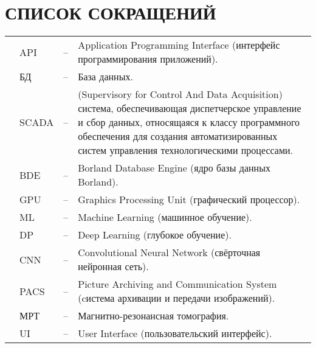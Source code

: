 \sectionbreak \section*{ 
    \gostTitleFont
    \redline
    СПИСОК СОКРАЩЕНИЙ
}
\titlespace

{\gostFont

\begin{tabular}{p{0.85cm} p{1.75cm} p{0.3cm} p{131.5mm}}
    & API & {--} & Application Programming Interface (интерфейс программирования приложений). \\
    & БД & {--} & База данных. \\
    & SCADA & {--} & (Supervisory for Control And Data Acquisition) система, обеспечивающая диспетчерское управление и сбор данных, относящаяся к классу программного обеспечения для создания автоматизированных систем управления технологическими процессами. \\
    & BDE & {--} & Borland Database Engine (ядро базы данных Borland). \\
    & GPU & {--} & Graphics Processing Unit (графический процессор). \\
    & ML & {--} & Machine Learning (машинное обучение). \\
    & DP & {--} & Deep Learning (глубокое обучение). \\
    & CNN & {--} & Convolutional Neural Network (свёрточная нейронная сеть). \\
    & PACS & {--} & Picture Archiving and Communication System (cистема архивации и передачи изображений). \\
    & МРТ & {--} & Магнитно-резонансная томография. \\
    & UI & {--} &  User Interface (пользовательский интерфейс). \\
\end{tabular}

}
